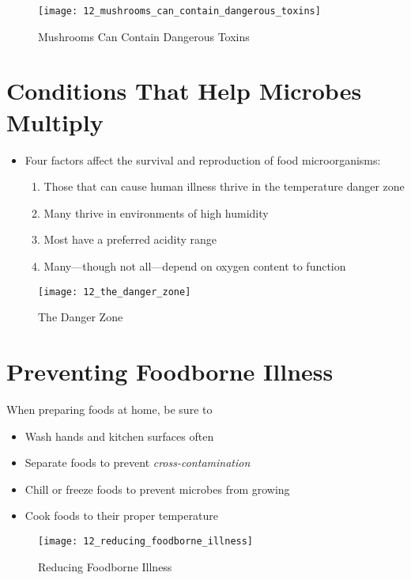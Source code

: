 \documentclass[title={Chapter 12}]{fdsn201notes}
\begin{document}
\begin{figure}[H]
	\centering
	\texttt{[image: 12\_mushrooms\_can\_contain\_dangerous\_toxins]}
	\caption{Mushrooms Can Contain Dangerous Toxins}
	\label{fig:mushrooms-can-contain-dangerous-toxins}
\end{figure}

\section{Conditions That Help Microbes Multiply}\label{sec:conditions-that-help-microbes-multiply}
\begin{itemize}
	\item Four factors affect the survival and reproduction of food microorganisms:
	\begin{enumerate}[label=\arabic*.,font=\bfseries\color{fdsnred}]
		\item Those that can cause human illness thrive in the temperature danger zone
		\item Many thrive in environments of high humidity
		\item Most have a preferred acidity range
		\item Many—though not all—depend on oxygen content to function
	\end{enumerate}
\end{itemize}

\begin{figure}[H]
	\centering
	\texttt{[image: 12\_the\_danger\_zone]}
	\caption{The Danger Zone}
	\label{fig:the-danger-zone}
\end{figure}

\section{Preventing Foodborne Illness}\label{sec:preventing-foodborne-illness}
When preparing foods at home, be sure to
\begin{itemize}
	\item Wash hands and kitchen surfaces often
	\item Separate foods to prevent \emph{cross-contamination}
	\item Chill or freeze foods to prevent microbes from growing
	\item Cook foods to their proper temperature
\end{itemize}

\begin{figure}[H]
	\centering
	\texttt{[image: 12\_reducing\_foodborne\_illness]}
	\caption{Reducing Foodborne Illness}
	\label{fig:reducing-foodborne-illness}
\end{figure}
\end{document}
